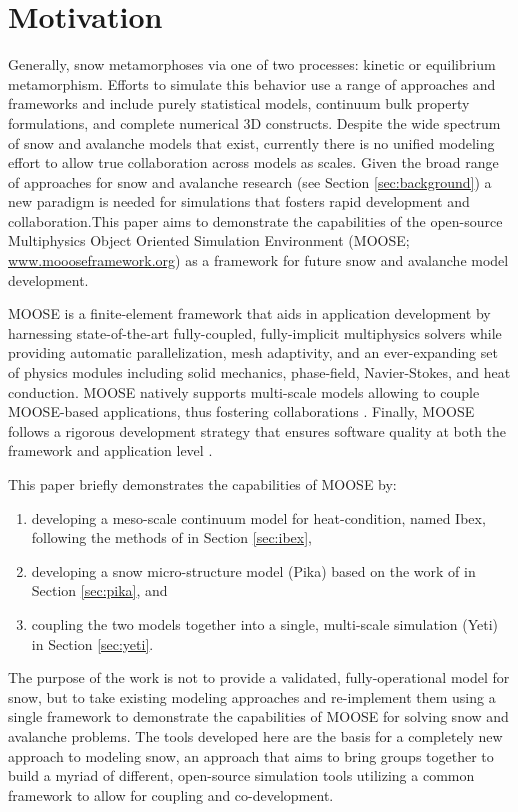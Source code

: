 \section{Motivation}\label{sec:motivation}
Generally, snow metamorphoses via one of two processes: kinetic or equilibrium metamorphism. Efforts to simulate this behavior use a range of approaches and frameworks and include purely statistical models, continuum bulk property formulations, and complete numerical 3D constructs. Despite the wide spectrum of snow and avalanche models that exist, currently there is no unified modeling effort to allow true collaboration across models as scales. Given the broad range of approaches for snow and avalanche research (see Section \ref{sec:background}) a new paradigm is needed for simulations that fosters rapid development and collaboration.\authorcorrespond This paper aims to demonstrate the capabilities of the open-source Multiphysics Object Oriented Simulation Environment (MOOSE; \url{www.moooseframework.org}) as a framework for future snow and avalanche model development.

MOOSE is a finite-element framework that aids in application development by harnessing state-of-the-art fully-coupled, fully-implicit multiphysics solvers while providing automatic parallelization, mesh adaptivity, and an ever-expanding set of physics modules including solid mechanics, phase-field, Navier-Stokes, and heat conduction. MOOSE natively supports multi-scale models allowing to couple MOOSE-based applications, thus fostering collaborations \citep{gaston2014physics}. Finally, MOOSE follows a rigorous development strategy that ensures software quality at both the framework and application level \citep{gaston2014continous}.

This paper briefly demonstrates the capabilities of MOOSE by:
\begin{enumerate}\setlength{\itemsep}{0pt}
\item developing a meso-scale continuum model for heat-condition, named Ibex, following the methods of \citet{slaughter2010numerical} in Section \ref{sec:ibex},
\item developing a snow micro-structure model (Pika) based on the work of \citet{kaempfer2009phase} in Section \ref{sec:pika}, and
\item coupling the two models together into a single, multi-scale simulation (Yeti) in Section \ref{sec:yeti}.
\end{enumerate}

The purpose of the work is not to provide a validated, fully-operational model for snow, but to take existing modeling approaches and re-implement them using a single framework to demonstrate the capabilities of MOOSE for solving snow and avalanche problems. The tools developed here are the basis for a completely new approach to modeling snow, an approach that aims to bring groups together to build a myriad of different, open-source simulation tools utilizing a common framework to allow for coupling and co-development.


